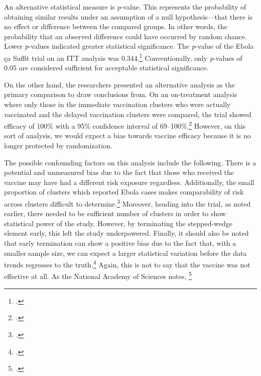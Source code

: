 \documentclass[letterpaper,notitlepage,12pt]{article}
\begin{document}
An alternative statistical measure is \textit{p}-value.
This represents the probability of obtaining similar results under an assumption
of a null hypothesis---that there is no effect or difference between the
compared groups.
In other words, the probability that an observed difference could have occurred
by random chance.
Lower \textit{p}-values indicated greater statistical significance.
The \textit{p}-value of the Ebola \c{c}a Suffit trial on an ITT analysis was
0.344.\footcite{HR 2016}
Conventionally, only \textit{p}-values of 0.05 are considered sufficient for
acceptable statistical significance.

On the other hand, the researchers presented an alternative analysis as the
primary comparison to draw conclusions from.
On an on-treatment analysis where only those in the immediate vaccination
clusters who were actually vaccinated and the delayed vaccination clusters were
compared, the
trial showed efficacy of 100\% with a 95\% confidence interval of
69--100\%.\footcite{HR 2016}
However, on this sort of analysis, we would expect a bias towards vaccine
efficacy because it is no longer protected by randomization.

The possible confounding factors on this analysis include the following.
There is a potential and unmeasured bias due to the fact that those who received
the vaccine may have had a different risk exposure regardless. 
Additionally, the small
proportion of clusters which reported Ebola cases makes comparability of risk
across clusters difficult to determine.\footcite[p. 129]{NAP}
Moreover, heading into the trial, as noted earlier, there needed to be
sufficient number of clusters in order to show statistical power of the study.
However, by terminating the stepped-wedge element early, this left the study
underpowered.
Finally, it should also be noted that early termination can show a
positive bias due to the fact that, with a smaller sample size, we can expect a
larger statistical variation before the data trends regresses to the 
truth.\footcite{handbook}
Again, this is not to say that the vaccine was not effective at all.
As the National Academy of Sciences notes, \footcite[p.
128]{NAP}
\end{document}
